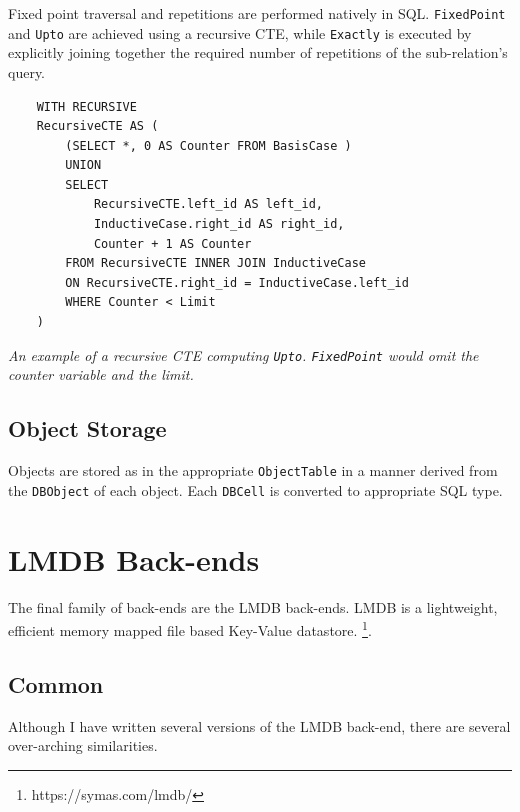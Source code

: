 \documentclass[12pt,a4paper,twoside,openright]{report}
\newcommand\codeName[1]{\texttt{#1}}
\newcommand\note[1]{\textit{#1}}
\renewcommand{\baselinestretch}{1.1}    %
\begin{document}
Fixed point traversal and repetitions are performed natively in SQL. \codeName{FixedPoint} and \codeName{Upto} are achieved using a recursive CTE, while \codeName{Exactly} is executed by explicitly joining together the required number of repetitions of the sub-relation's query.	

\renewcommand{\baselinestretch}{0.8}
	\begin{framed}
	\begin{verbatim}
	WITH RECURSIVE
    RecursiveCTE AS (
    	(SELECT *, 0 AS Counter FROM BasisCase )
    	UNION
    	SELECT 
    		RecursiveCTE.left_id AS left_id,
    		InductiveCase.right_id AS right_id,
    		Counter + 1 AS Counter
    	FROM RecursiveCTE INNER JOIN InductiveCase
    	ON RecursiveCTE.right_id = InductiveCase.left_id
    	WHERE Counter < Limit
    )
	\end{verbatim}
	\renewcommand{\baselinestretch}{1.1}
	\note{An example of a recursive CTE computing \codeName{Upto}. \codeName{FixedPoint} would omit the counter variable and the limit.}
	\end{framed}
	
	\subsection{Object Storage}
	Objects are stored as in the appropriate \codeName{ObjectTable} in a manner derived from the \codeName{DBObject} of each object. Each \codeName{DBCell} is converted to appropriate SQL type.

\section{LMDB Back-ends}
The final family of back-ends are the LMDB back-ends. LMDB is a lightweight, efficient memory mapped file based Key-Value datastore. \footnote{https://symas.com/lmdb/}.

	\subsection{Common}
	Although I have written several versions of the LMDB back-end, there are several over-arching similarities.
\end{document}

